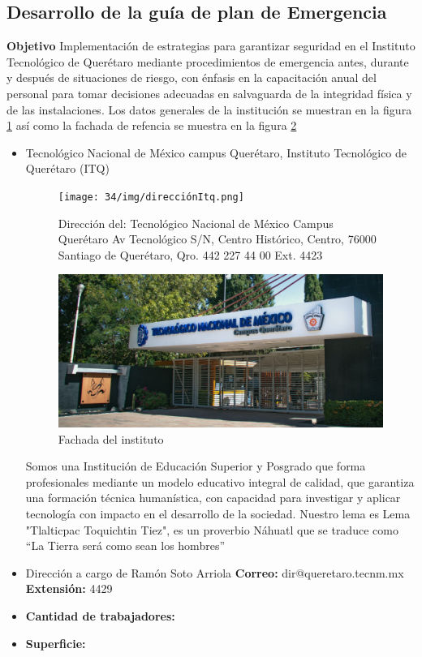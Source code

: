     \subsection{Desarrollo de la guía de plan de Emergencia}
    \textbf{Objetivo}
    Implementación de estrategias para garantizar seguridad en el Instituto Tecnológico de Querétaro mediante procedimientos de emergencia antes, durante y después de situaciones de riesgo, con énfasis en la capacitación anual del personal para tomar decisiones adecuadas en salvaguarda de la integridad física y de las instalaciones. Los datos generales de la institución se muestran en la figura \ref{fig:enter-label4} así como la fachada de refencia se muestra en la figura \ref{fig:enter-label5}
    \begin{itemize}
        \item Tecnológico Nacional de México campus Querétaro, Instituto Tecnológico de Querétaro (ITQ)
    \begin{figure}[H]
        \centering
        \texttt{[image: 34/img/direcciónItq.png]}
        \caption{Dirección del: Tecnológico Nacional de México Campus Querétaro Av Tecnológico S/N, Centro Histórico, Centro, 76000 Santiago de Querétaro, Qro. 442 227 44 00 Ext. 4423}
        \label{fig:enter-label4}
    \end{figure}
    \begin{figure}[H]
        \centering
        \includegraphics[scale=0.3]{34/img/itq.png}
        \caption{Fachada del instituto}
        \label{fig:enter-label5}
    \end{figure}
    Somos una Institución de Educación Superior y Posgrado que forma profesionales mediante un modelo educativo integral de calidad, que garantiza una formación técnica humanística, con capacidad para investigar y aplicar tecnología con impacto en el desarrollo de la sociedad. Nuestro lema es Lema "Tlalticpac Toquichtin Tiez", es un proverbio Náhuatl que se traduce como “La Tierra será como sean los hombres” 
    
    \item Dirección a cargo de Ramón Soto Arriola	\textbf{Correo:} dir@queretaro.tecnm.mx	\textbf{Extensión:} 4429
    \item \textbf{Cantidad de trabajadores:}
    \item \textbf{Superficie:}
    \end{itemize}
